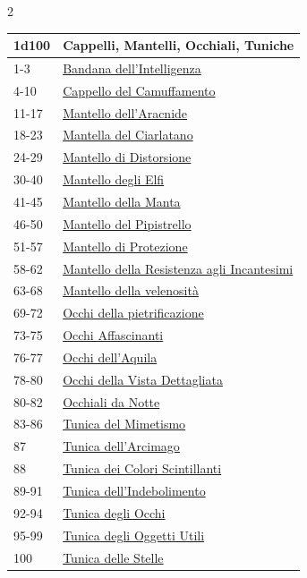 \begin{multicols}{2}
{{\small\begin{tabularx}{\linewidth}{ll}
		\toprule
\rowcolor{gray!20}\textbf{1d100} & \textbf{Cappelli, Mantelli, Occhiali, Tuniche}\\
\toprule
1-3 & \hyperlink{Bandana dell'Intelligenza}{Bandana dell'Intelligenza}\\
\rowcolor{gray!20}4-10 & \hyperlink{Cappello del Camuffamento}{Cappello del Camuffamento}\\
11-17 & \hyperlink{Mantello dell'Aracnide}{Mantello dell'Aracnide}\\
\rowcolor{gray!20}18-23 & \hyperlink{Mantella del Ciarlatano}{Mantella del Ciarlatano}\\
24-29 & \hyperlink{Mantello di Distorsione}{Mantello di Distorsione}\\
\rowcolor{gray!20}30-40 & \hyperlink{Mantello degli Elfi}{Mantello degli Elfi}\\
41-45 & \hyperlink{Mantello della Manta}{Mantello della Manta}\\
\rowcolor{gray!20}46-50 & \hyperlink{Mantello del Pipistrello}{Mantello del Pipistrello}\\
51-57 & \hyperlink{Mantello di Protezione}{Mantello di Protezione}\\
\rowcolor{gray!20}58-62 & \hyperlink{Mantello della Resistenza agli Incantesimi}{Mantello della Resistenza agli Incantesimi}\\
63-68 & \hyperlink{Mantello della velenosità}{Mantello della velenosità}\\
\rowcolor{gray!20}69-72 & \hyperlink{Occhi della pietrificazione}{Occhi della pietrificazione}\\
73-75 & \hyperlink{Occhi Affascinanti}{Occhi Affascinanti}\\
\rowcolor{gray!20}76-77 & \hyperlink{Occhi dell'Aquila}{Occhi dell'Aquila}\\
78-80 & \hyperlink{Occhi della Vista Dettagliata}{Occhi della Vista Dettagliata}\\
\rowcolor{gray!20}80-82 & \hyperlink{Occhiali da Notte}{Occhiali da Notte}\\
83-86 & \hyperlink{Tunica del Mimetismo}{Tunica del Mimetismo}\\
\rowcolor{gray!20}87 & \hyperlink{Tunica dell'Arcimago}{Tunica dell'Arcimago}\\
88 & \hyperlink{Tunica dei Colori Scintillanti}{Tunica dei Colori Scintillanti}\\
\rowcolor{gray!20}89-91 & \hyperlink{Tunica dell'Indebolimento}{Tunica dell'Indebolimento}\\
92-94 & \hyperlink{Tunica degli Occhi}{Tunica degli Occhi}\\
\rowcolor{gray!20}95-99 & \hyperlink{Tunica degli Oggetti Utili}{Tunica degli Oggetti Utili}\\
100 & \hyperlink{Tunica delle Stelle}{Tunica delle Stelle}
\end{tabularx}}

}
\end{multicols}
